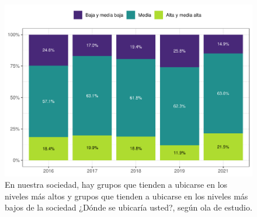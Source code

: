 \documentclass[
  12pt,
]{book}
\begin{document}
\begin{figure}

{\centering \includegraphics{reporte-elsoc_files/figure-latex/ess-ola-1} 

}

\caption{En nuestra sociedad, hay grupos que tienden a ubicarse en los niveles más altos y grupos que tienden a ubicarse en los niveles más bajos de la sociedad ¿Dónde se ubicaría usted?, según ola de estudio.}\label{fig:ess-ola}
\end{figure}
\end{document}
